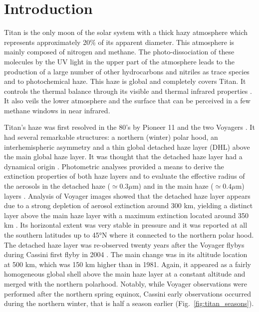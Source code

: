 \section{Introduction}

Titan is the only moon of the solar system with a thick hazy atmosphere which represents approximately 20\% of its apparent
diameter. This atmosphere is mainly composed of nitrogen and methane. The photo-dissociation of these molecules by the
UV light in the upper part of the atmosphere leads to the production of a large number of other hydrocarbons and nitriles as
trace species and to photochemical haze. This haze is global and completely covers Titan. It controls
the thermal balance through its visible and thermal infrared properties \citep[e.g.][]{Bezard2018}.
It also veils the lower atmosphere and the surface that can be perceived in a few methane windows in near infrared.

Titan's haze was first resolved in the 80's by Pioneer 11 \citep{Smith1980} and the two Voyagers
\citep{Smith1981, Smith1982, Sromovsky1981}. It had several remarkable structures: a northern (winter)
polar hood, an interhemispheric asymmetry and a thin global detached haze layer (DHL) above the main global haze layer. It was
thought that the detached haze layer had a dynamical origin \citep{Smith1981}. Photometric analyses provided a means
to derive the extinction properties of both haze layers and to evaluate the effective radius of the aerosols in the detached
haze ($\simeq 0.3 \mu$m) and in the main haze ($\simeq 0.4 \mu$m) layers \citep{Rages1983, Rages1983a}. Analysis of Voyager images showed
that the detached haze layer appears due to a strong depletion of aerosol extinction around 300 km, yielding a distinct
layer above the main haze layer with a maximum extinction located around 350 km \citep{Rages1983}. Its horizontal extent was
very stable in pressure and it was reported at all the southern latitudes up to \ang{45}N where it connected to the northern
polar hood. The detached haze layer was re-observed twenty years after the Voyager flybys during Cassini first flyby in 2004
\citep{Porco2005}. The main change was in its altitude location at 500 km, which was 150 km higher than in 1981.
Again, it appeared as a fairly homogeneous global shell above the main haze layer at a constant altitude and
merged with the northern polarhood. Notably, while Voyager observations were performed after the northern spring equinox,
Cassini early observations occurred during the northern winter, that is half a season earlier (Fig.~\ref{fig:titan_seasons}).

